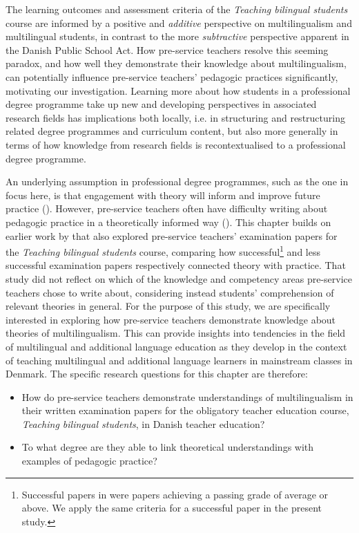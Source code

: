 \documentclass[output=paper]{langscibook}
\begin{document}
The learning outcomes and assessment criteria of the \textit{Teaching bilingual students} course are informed by a positive and \textit{additive} perspective on multilingualism and multilingual students, in contrast to the more \textit{subtractive} perspective \citep{Holmen2019} apparent in the Danish Public School Act. How pre-service teachers resolve this seeming paradox, and how well they demonstrate their knowledge about multilingualism, can potentially influence pre-service teachers’ pedagogic practices significantly, motivating our investigation. Learning more about how students in a professional degree programme take up new and developing perspectives in associated research fields has implications both locally, i.e. in structuring and restructuring related degree programmes and curriculum content, but also more generally in terms of how knowledge from research fields is recontextualised to a professional degree programme.

An underlying assumption in professional degree programmes, such as the one in focus here, is that engagement with theory will inform and improve future practice (\citealt{ShayClarence-Fincham2016}). However, pre-service teachers often have difficulty writing about pedagogic practice in a theoretically informed way (\citealt{NielsenPaulsen2006}). This chapter builds on earlier work by \citet{Meidell_sigsgaard2021} that also explored pre-service teachers’ examination papers for the \textit{Teaching bilingual students} course, comparing how successful\footnote{\textrm{Successful papers in \citet{Meidell_sigsgaard2021} were papers achieving a passing grade of average or above. We apply the same criteria for a successful paper in the present study.}} and less successful examination papers respectively connected theory with practice. That study did not reflect on which of the knowledge and competency areas pre-service teachers chose to write about, considering instead students’ comprehension of relevant theories in general. For the purpose of this study, we are specifically interested in exploring how pre-service teachers demonstrate knowledge about theories of multilingualism. This can provide insights into tendencies in the field of multilingual and additional language education as they develop in the context of teaching multilingual and additional language learners in mainstream classes in Denmark. The specific research questions for this chapter are therefore: 

\begin{itemize}
\item  How do pre-service teachers demonstrate understandings of multilingualism in their written examination papers for the obligatory teacher education course, \textit{Teaching bilingual students}, in Danish teacher education?
\item  To what degree are they able to link theoretical understandings with examples of pedagogic practice?
\end{itemize}
\end{document}
